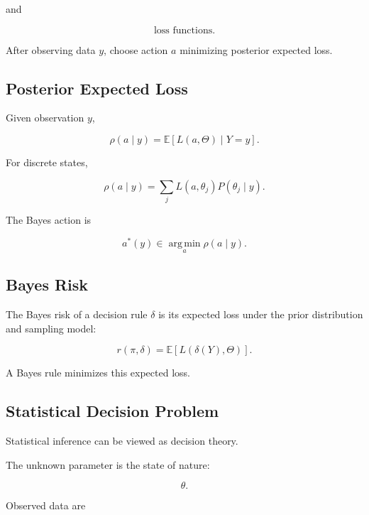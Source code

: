 and

\[
\boxed{
\text{loss functions}.
}
\]

After observing data \(y\), choose action \(a\) minimizing posterior
expected loss.

\subsection{Posterior Expected Loss}
\label{subsec:posterior-expected-loss}

Given observation \(y\),

\[
\boxed{
\rho(a\mid y)
=
\mathbb{E}
[
L(a,\Theta)
\mid
Y=y
].
}
\]

For discrete states,

\[
\boxed{
\rho(a\mid y)
=
\sum_j
L(a,\theta_j)
P(\theta_j\mid y).
}
\]

The Bayes action is

\[
\boxed{
a^*(y)
\in
\operatorname*{arg\,min}_a
\rho(a\mid y).
}
\]

\subsection{Bayes Risk}
\label{subsec:bayes-risk}

The Bayes risk of a decision rule \(\delta\) is its expected loss under the
prior distribution and sampling model:

\[
\boxed{
r(\pi,\delta)
=
\mathbb{E}
[
L
(
\delta(Y),
\Theta
)
].
}
\]

A Bayes rule minimizes this expected loss.

\subsection{Statistical Decision Problem}
\label{subsec:statistical-decision-problem}

Statistical inference can be viewed as decision theory.

The unknown parameter is the state of nature:

\[
\boxed{
\theta.
}
\]

Observed data are

